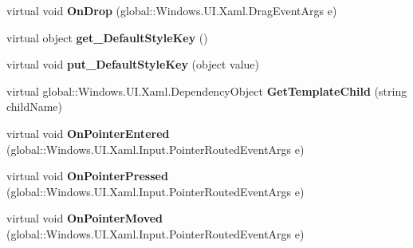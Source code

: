 \begin{DoxyCompactItemize}
\item 
\mbox{\label{class_windows_1_1_u_i_1_1_xaml_1_1_controls_1_1_control_ade79c678fe0c5aa32e43c4772d34e61e}} 
virtual void {\bfseries On\+Drop} (global\+::\+Windows.\+U\+I.\+Xaml.\+Drag\+Event\+Args e)
\item 
\mbox{\label{class_windows_1_1_u_i_1_1_xaml_1_1_controls_1_1_control_a0f6b7d0a6e0dbad0ff65dd5861c20050}} 
virtual object {\bfseries get\+\_\+\+Default\+Style\+Key} ()
\item 
\mbox{\label{class_windows_1_1_u_i_1_1_xaml_1_1_controls_1_1_control_a6cc396f98c5876ae256d5b6d1c78ded9}} 
virtual void {\bfseries put\+\_\+\+Default\+Style\+Key} (object value)
\item 
\mbox{\label{class_windows_1_1_u_i_1_1_xaml_1_1_controls_1_1_control_ac603c14d7442a0aa06e00197591e9394}} 
virtual global\+::\+Windows.\+U\+I.\+Xaml.\+Dependency\+Object {\bfseries Get\+Template\+Child} (string child\+Name)
\item 
\mbox{\label{class_windows_1_1_u_i_1_1_xaml_1_1_controls_1_1_control_ae3e99583865513e0de94e3c419b26924}} 
virtual void {\bfseries On\+Pointer\+Entered} (global\+::\+Windows.\+U\+I.\+Xaml.\+Input.\+Pointer\+Routed\+Event\+Args e)
\item 
\mbox{\label{class_windows_1_1_u_i_1_1_xaml_1_1_controls_1_1_control_a72d13df130e7f9b6c8cc7fbbf022be49}} 
virtual void {\bfseries On\+Pointer\+Pressed} (global\+::\+Windows.\+U\+I.\+Xaml.\+Input.\+Pointer\+Routed\+Event\+Args e)
\item 
\mbox{\label{class_windows_1_1_u_i_1_1_xaml_1_1_controls_1_1_control_ae671c763ce297220751cee1945c9265b}} 
virtual void {\bfseries On\+Pointer\+Moved} (global\+::\+Windows.\+U\+I.\+Xaml.\+Input.\+Pointer\+Routed\+Event\+Args e)
\item 
\mbox{\label{class_windows_1_1_u_i_1_1_xaml_1_1_controls_1_1_control_a1a16d49c087d495de68e1f9953a4ebfd}} 

\end{DoxyCompactItemize}
